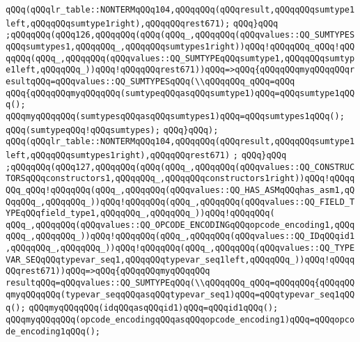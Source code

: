 \verb|qQQq(qQQqlr_table::NONTERMqQQq104,qQQqqQQq(qQQqresult,qQQqqQQqsumtype1left,qQQqqQQqsumtype1right),qQQqqQQqrest671);|\newline
\verb|qQQq}qQQq|\newline
\verb|;qQQqqQQq(qQQq126,qQQqqQQq(qQQq(qQQq_,qQQqqQQq(qQQqvalues::QQ_SUMTYPESqQQqsumtypes1,qQQqqQQq_,qQQqqQQqsumtypes1right))qQQq!qQQqqQQq_qQQq!qQQqqQQq(qQQq_,qQQqqQQq(qQQqvalues::QQ_SUMTYPEqQQqsumtype1,qQQqqQQqsumtype1left,qQQqqQQq_))qQQq!qQQqqQQqrest671))qQQq=>qQQq{qQQqqQQqmyqQQqqQQqresultqQQq=qQQqvalues::QQ_SUMTYPESqQQq(\\qQQqqQQq_qQQq=qQQq|\newline
\verb|qQQq{qQQqqQQqmyqQQqqQQq(sumtypeqQQqasqQQqsumtype1)qQQq=qQQqsumtype1qQQq();|\newline
\verb|qQQqmyqQQqqQQq(sumtypesqQQqasqQQqsumtypes1)qQQq=qQQqsumtypes1qQQq();|\newline
\verb|qQQq(sumtypeqQQq!qQQqsumtypes);|\newline
\verb|qQQq}qQQq);|\newline
\verb|qQQq(qQQqlr_table::NONTERMqQQq104,qQQqqQQq(qQQqresult,qQQqqQQqsumtype1left,qQQqqQQqsumtypes1right),qQQqqQQqrest671)|\newline
\verb|;|\newline
\verb|qQQq}qQQq|\newline
\verb|;qQQqqQQq(qQQq127,qQQqqQQq(qQQq(qQQq_,qQQqqQQq(qQQqvalues::QQ_CONSTRUCTORSqQQqconstructors1,qQQqqQQq_,qQQqqQQqconstructors1right))qQQq!qQQqqQQq_qQQq!qQQqqQQq(qQQq_,qQQqqQQq(qQQqvalues::QQ_HAS_ASMqQQqhas_asm1,qQQqqQQq_,qQQqqQQq_))qQQq!qQQqqQQq(qQQq_,qQQqqQQq(qQQqvalues::QQ_FIELD_TYPEqQQqfield_type1,qQQqqQQq_,qQQqqQQq_))qQQq!qQQqqQQq(|\newline
\verb|qQQq_,qQQqqQQq(qQQqvalues::QQ_OPCODE_ENCODINGqQQqopcode_encoding1,qQQqqQQq_,qQQqqQQq_))qQQq!qQQqqQQq(qQQq_,qQQqqQQq(qQQqvalues::QQ_IDqQQqid1,qQQqqQQq_,qQQqqQQq_))qQQq!qQQqqQQq(qQQq_,qQQqqQQq(qQQqvalues::QQ_TYPEVAR_SEQqQQqtypevar_seq1,qQQqqQQqtypevar_seq1left,qQQqqQQq_))qQQq!qQQqqQQqrest671))qQQq=>qQQq{qQQqqQQqmyqQQqqQQq|\newline
\verb|resultqQQq=qQQqvalues::QQ_SUMTYPEqQQq(\\qQQqqQQq_qQQq=qQQqqQQq{qQQqqQQqmyqQQqqQQq(typevar_seqqQQqasqQQqtypevar_seq1)qQQq=qQQqtypevar_seq1qQQq();|\newline
\verb|qQQqmyqQQqqQQq(idqQQqasqQQqid1)qQQq=qQQqid1qQQq();|\newline
\verb|qQQqmyqQQqqQQq(opcode_encodingqQQqasqQQqopcode_encoding1)qQQq=qQQqopcode_encoding1qQQq();|\newline
